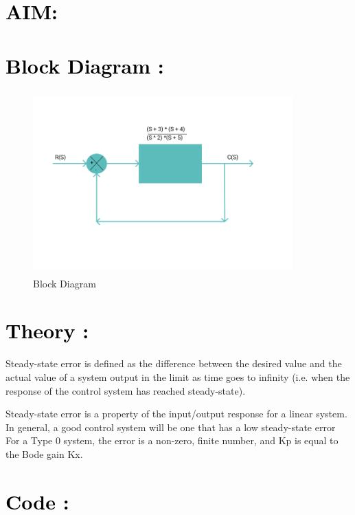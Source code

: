 \documentclass[12pt]{article}
\begin{document}
\section*{\textcolor{black}{AIM: }}

\section*{\textcolor{black}{Block Diagram :}}

\begin{figure}[!hth]
        \centering
        \includegraphics[width =10cm, height = 7cm]{images/exp7.png}
        \caption{Block Diagram}
        \label{Graph}
\end{figure}

\section*{\textcolor{black}{Theory :}}
Steady-state error is defined as the difference between the desired value and the actual value of a system output in the limit as time goes to infinity (i.e. when the response of the control system has reached steady-state).\par

Steady-state error is a property of the input/output response for a linear system. In general, a good control system will be one that has a low steady-state error
For a Type 0 system, the error is a non-zero, finite number, and Kp is equal to the Bode gain Kx. \par

\section*{\textcolor{black}{Code :}}
\end{document}
